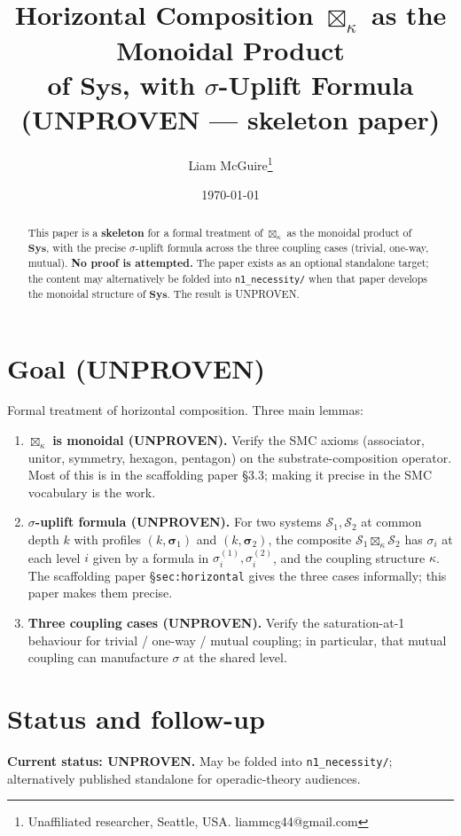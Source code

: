 \documentclass[11pt]{article}
\title{Horizontal Composition $\boxtimes_\kappa$ as the Monoidal Product \\
       of $\mathbf{Sys}$, with $\sigma$-Uplift Formula \\
       \large (UNPROVEN --- skeleton paper)}
\author{Liam McGuire\thanks{Unaffiliated researcher, Seattle, USA. liammcg44@gmail.com}}
\date{\today}
\theoremstyle{plain}
\theoremstyle{definition}
\begin{document}
\maketitle

\begin{abstract}
This paper is a \textbf{skeleton} for a formal treatment of
$\boxtimes_\kappa$ as the monoidal product of $\mathbf{Sys}$, with
the precise $\sigma$-uplift formula across the three coupling cases
(trivial, one-way, mutual). \textbf{No proof is attempted.} The paper
exists as an optional standalone target; the content may
alternatively be folded into \texttt{n1\_necessity/} when that paper
develops the monoidal structure of $\mathbf{Sys}$. The result is
UNPROVEN.
\end{abstract}

\section{Goal (UNPROVEN)}

Formal treatment of horizontal composition. Three main lemmas:

\begin{enumerate}[leftmargin=2em,itemsep=4pt]
  \item \textbf{$\boxtimes_\kappa$ is monoidal (UNPROVEN).} Verify
    the SMC axioms (associator, unitor, symmetry, hexagon, pentagon)
    on the substrate-composition operator. Most of this is in the
    scaffolding paper §3.3; making it precise in the SMC vocabulary
    is the work.
  \item \textbf{$\sigma$-uplift formula (UNPROVEN).} For two systems
    $\mathcal{S}_1, \mathcal{S}_2$ at common depth $k$ with profiles
    $(k, \boldsymbol{\sigma}_1)$ and $(k, \boldsymbol{\sigma}_2)$,
    the composite $\mathcal{S}_1 \boxtimes_\kappa \mathcal{S}_2$ has
    $\sigma_i$ at each level $i$ given by a formula in $\sigma_i^{(1)},
    \sigma_i^{(2)}$, and the coupling structure $\kappa$. The
    scaffolding paper §\texttt{sec:horizontal} gives the three cases
    informally; this paper makes them precise.
  \item \textbf{Three coupling cases (UNPROVEN).} Verify the
    saturation-at-1 behaviour for trivial / one-way / mutual
    coupling; in particular, that mutual coupling can manufacture
    $\sigma$ at the shared level.
\end{enumerate}

\section{Status and follow-up}

\textbf{Current status: UNPROVEN.} May be folded into
\texttt{n1\_necessity/}; alternatively published standalone for
operadic-theory audiences.



\end{document}
